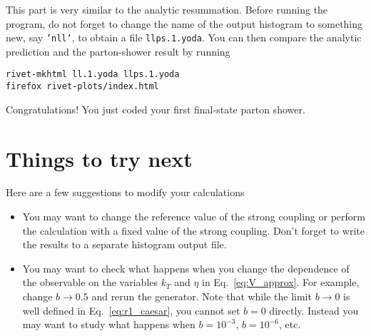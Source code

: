\documentclass[10pt,fleqn]{scrartcl}
\begin{document}
This part is very similar to the analytic resummation. Before running
the program, do not forget to change the name of the output histogram to
something new, say {\tt 'nll'}, to obtain a file {\tt llps.1.yoda}.
You can then compare the analytic prediction and the parton-shower result
by running
\begin{verbatim}
rivet-mkhtml ll.1.yoda llps.1.yoda
firefox rivet-plots/index.html
\end{verbatim}
Congratulations! You just coded your first final-state parton shower.

\section{Things to try next}
Here are a few suggestions to modify your calculations
\begin{itemize}
\item You may want to change the reference value of the strong coupling
  or perform the calculation with a fixed value of the strong coupling.
  Don't forget to write the results to a separate histogram output file.
\item You may want to check what happens when you change the dependence
  of the observable on the variables $k_T$ and $\eta$ in Eq.~\eqref{eq:V_approx}.
  For example, change $b\to 0.5$ and rerun the generator.
  Note that while the limit $b\to 0$ is well defined in Eq.~\eqref{eq:r1_caesar},
  you cannot set $b=0$ directly. Instead you may want to study what happens
  when $b=10^{-3}$, $b=10^{-6}$, etc.
\end{itemize}
\end{document}
